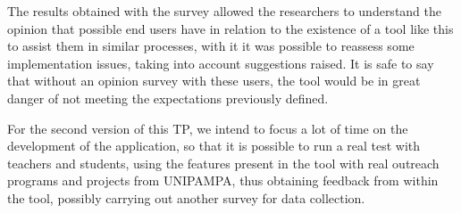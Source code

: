 The results obtained with the survey allowed the researchers to understand the opinion that possible end users have in relation to the existence of a tool like this to assist them in similar processes, with it it was possible to reassess some implementation issues, taking into account suggestions raised. 
It is safe to say that without an opinion survey with these users, the tool would be in great danger of not meeting the expectations previously defined.


For the second version of this \ac{TP}, we intend to focus a lot of time on the development of the application, so that it is possible to run a real test with teachers and students, using the features present in the tool with real outreach programs and projects from \ac{UNIPAMPA}, thus obtaining feedback from within the tool, possibly carrying out another survey for data collection.
